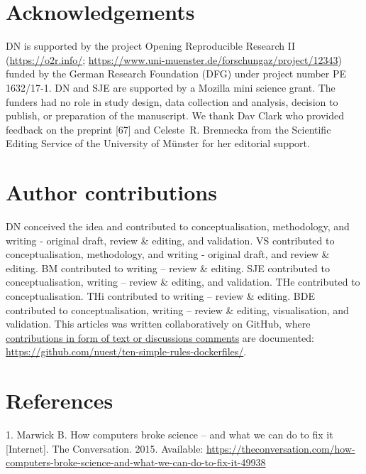 \documentclass[10pt,letterpaper]{article}
\begin{document}
\hypertarget{acknowledgements}{%
\section*{Acknowledgements}\label{acknowledgements}}

DN is supported by the project Opening Reproducible Research II
(\href{https://o2r.info/}{https://o2r.info/};
\href{https://www.uni-muenster.de/forschungaz/project/12343}{https://www.uni-muenster.de/forschungaz/project/12343})
funded by the German Research Foundation (DFG) under project number PE
1632/17-1. DN and SJE are supported by a Mozilla mini science grant. The
funders had no role in study design, data collection and analysis,
decision to publish, or preparation of the manuscript. We thank Dav
Clark who provided feedback on the preprint {[}67{]} and Celeste~R.
Brennecka from the Scientific Editing Service of the University of
Münster for her editorial support.

\hypertarget{contributions}{%
\section*{Author contributions}\label{contributions}}

DN conceived the idea and contributed to conceptualisation, methodology,
and writing - original draft, review \& editing, and validation. VS
contributed to conceptualisation, methodology, and writing - original
draft, and review \& editing. BM contributed to writing -- review \&
editing. SJE contributed to conceptualisation, writing -- review \&
editing, and validation. THe contributed to conceptualisation. THi
contributed to writing -- review \& editing. BDE contributed to
conceptualisation, writing -- review \& editing, visualisation, and
validation. This articles was written collaboratively on GitHub, where
\href{https://github.com/nuest/ten-simple-rules-dockerfiles/graphs/contributors}{contributions
in form of text or discussions comments} are documented:
\url{https://github.com/nuest/ten-simple-rules-dockerfiles/}.

\hypertarget{references}{%
\section*{References}\label{references}}

\hypertarget{refs}{}
\leavevmode\hypertarget{ref-marwick_how_2015}{}%
1. Marwick B. How computers broke science -- and what we can do to fix
it {[}Internet{]}. The Conversation. 2015. Available:
\url{https://theconversation.com/how-computers-broke-science-and-what-we-can-do-to-fix-it-49938}
\end{document}

